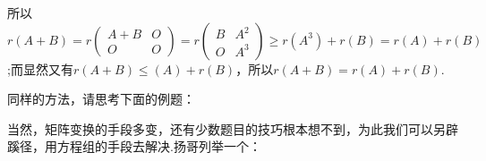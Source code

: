 \documentclass{article}
\begin{document}

所以$r \left(A + B\right)
    =
    r \left(\begin{array}{cc}
            A + B & O \\
            O     & O
        \end{array}\right)
    =
    r \left(\begin{array}{cc}
            B & A^2 \\
            O & A^3
        \end{array}\right)
    \ge
    r \left(A^3\right) + r \left(B\right)
    =
    r \left(A\right) + r \left(B\right)$
;而显然又有$r \left(A + B\right) \le \left(A\right) + r \left(B\right)$，所以$r \left(A + B\right) = r \left(A\right) + r \left(B\right)$.

\vspace{1ex}
同样的方法，请思考下面的例题：

\vspace{1ex}

当然，矩阵变换的手段多变，还有少数题目的技巧根本想不到，为此我们可以另辟蹊径，用方程组的手段去解决.扬哥列举一个：

\vspace{1ex}
\end{document}
